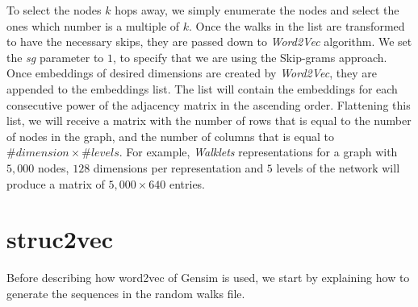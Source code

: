 \documentclass[a4paper,13pt]{article}
\begin{document}
To select the nodes $k$ hops away, we simply enumerate the nodes and select the ones which number is a multiple of $k$. Once the walks in the list are transformed to have the necessary skips, they are passed down to \textit{Word2Vec} algorithm. We set the \textit{sg} parameter to $1$, to specify that we are using the Skip-grams approach. Once embeddings of desired dimensions are created by \textit{Word2Vec}, they are appended to the embeddings list. The list will contain the embeddings for each consecutive power of the adjacency matrix in the ascending order. Flattening this list, we will receive a matrix with the number of rows that is equal to the number of nodes in the graph, and the number of columns that is equal to $\# dimension \times \# levels$. For example, \textit{Walklets} representations for a graph with $5,000$ nodes, $128$ dimensions per representation and $5$ levels of the network will produce a matrix of $5,000 \times 640$ entries.


\section{struc2vec}
Before describing how word2vec of Gensim is used, we start by explaining how to generate the sequences in the random walks file.
\end{document}
